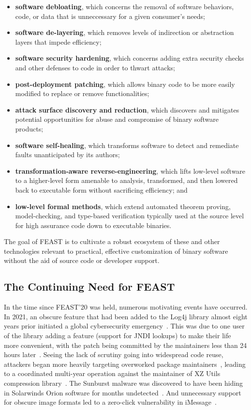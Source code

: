 \documentclass[sigconf]{acmart}
\begin{document}
\begin{itemize}[itemsep=.5ex plus1pt minus0pt]
  \item \textbf{software debloating}, which concerns the removal of software behaviors, code, or data that is unneccessary for a given consumer's needs;
  \item \textbf{software de-layering}, which removes levels of indirection or abstraction layers that impede efficiency;
  \item \textbf{software security hardening}, which concerns adding extra security checks and other defenses to code in order to thwart attacks;
  \item \textbf{post-deployment patching}, which allows binary code to be more easily modified to replace or remove functionalities;
  \item \textbf{attack surface discovery and reduction}, which discovers and mitigates potential opportunities for abuse and compromise of binary software products;
  \item \textbf{software self-healing}, which transforms software to detect and remediate faults unanticipated by its authors;
  \item \textbf{transformation-aware reverse-engineering}, which lifts low-level software to a higher-level form amenable to analysis, transformed, and then lowered back to executable form without sacrificing efficiency; and
  \item \textbf{low-level formal methods}, which extend automated theorem proving, model-checking, and type-based verification typically used at the source level for high assurance code down to executable binaries.
\end{itemize}

The goal of FEAST is to cultivate a robust ecosystem of these and other
technologies relevant to practical, effective customization of binary software
without the aid of source code or developer support.

\subsection{The Continuing Need for FEAST}
In the time since FEAST'20 was held, numerous motivating events have occurred.
In 2021, an obscure feature that had been added to the Log4j library
almost eight years prior initiated a global cybersecurity emergency~\cite{cisalog4j}.  This was
due to one user of the library adding a feature (support for JNDI lookups) to
make their life more convenient, with the patch being committed by the
maintainers less than 24 hours later~\cite{jndiflaw}.  Seeing the lack of
scrutiny going into widespread code reuse, attackers began more
heavily targeting overworked package maintainers~\cite{duan2021}, leading to a
coordinated multi-year operation against the maintainer of XZ Utils compression
library~\cite{xzutils}. The Sunburst malware was discovered to have been hiding
in Solarwinds Orion software for months undetected~\cite{sunburst}. And
unnecessary support for obscure image formats led to a zero-click vulnerability
in iMessage~\cite{forcedentry}.
\end{document}
